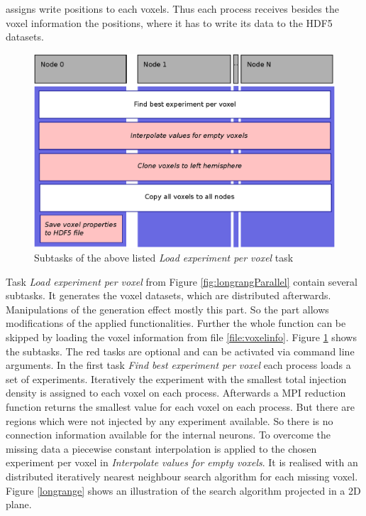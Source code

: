 assigns write positions to each voxels. Thus each process receives besides the 
voxel information the positions,
where it has to write its data to the HDF5 datasets.
\begin{figure}[ht!]
\centering
\includegraphics[scale=0.5]{pictures/longRange_BestExp_parallelAlg.eps}
\caption{Subtasks of the above listed \emph{Load experiment per voxel} task}
\label{fig:longrangeLEPV}
\end{figure}
Task \emph{Load experiment per voxel} from Figure \ref{fig:longrangParallel} contain several subtasks.
It generates the voxel datasets, which are distributed afterwards.
Manipulations of the generation effect mostly this part.
So the part allows modifications of the applied functionalities. 
Further the whole function can be skipped by loading the voxel information from file \ref{file:voxelinfo}.
Figure \ref{fig:longrangeLEPV} shows the subtasks.
The red tasks are optional and can be activated via command line arguments.
In the first task \emph{Find best experiment per voxel} each process loads a set of experiments.
Iteratively the experiment with the smallest total injection density is assigned to each voxel
on each process. Afterwards a MPI reduction function returns the smallest value for each voxel on
each process.
But there are regions which were not injected by any experiment available.
So there is no connection information available for the internal neurons.
To overcome the missing data a piecewise constant interpolation is applied to the chosen experiment per voxel
in \emph{Interpolate values for empty voxels}.
It is realised with an distributed iteratively nearest neighbour search algorithm for each missing voxel.
Figure \ref{longrange} shows an illustration of the search algorithm
projected in a 2D plane. 
